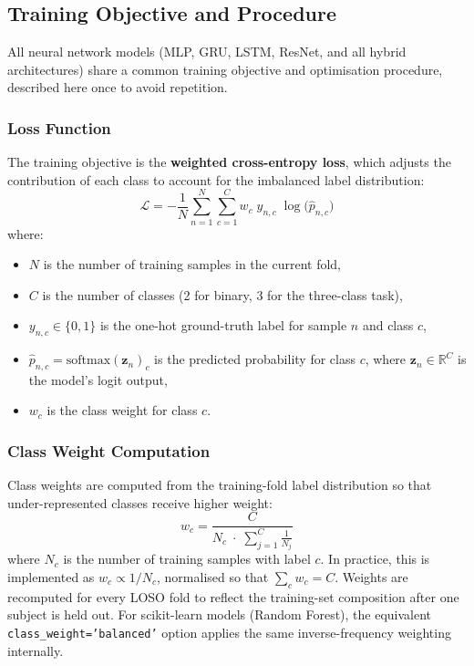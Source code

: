 \documentclass[11pt]{article}
\begin{document}
\subsection{Training Objective and Procedure}
\label{sec:training}

All neural network models (MLP, GRU, LSTM, ResNet, and all hybrid architectures) share a common training objective and optimisation procedure, described here once to avoid repetition.

\subsubsection{Loss Function}
The training objective is the \textbf{weighted cross-entropy loss}, which adjusts the contribution of each class to account for the imbalanced label distribution:
\begin{equation}
\mathcal{L} = -\frac{1}{N}\sum_{n=1}^{N} \sum_{c=1}^{C} w_c \; y_{n,c} \; \log\bigl(\hat{p}_{n,c}\bigr)
\label{eq:wce}
\end{equation}
where:
\begin{itemize}
    \item $N$ is the number of training samples in the current fold,
    \item $C$ is the number of classes (2 for binary, 3 for the three-class task),
    \item $y_{n,c} \in \{0, 1\}$ is the one-hot ground-truth label for sample $n$ and class $c$,
    \item $\hat{p}_{n,c} = \text{softmax}(\mathbf{z}_n)_c$ is the predicted probability for class $c$, where $\mathbf{z}_n \in \mathbb{R}^C$ is the model's logit output,
    \item $w_c$ is the class weight for class $c$.
\end{itemize}

\subsubsection{Class Weight Computation}
Class weights are computed from the training-fold label distribution so that under-represented classes receive higher weight:
\begin{equation}
w_c = \frac{C}{N_c \;\cdot\; \sum_{j=1}^{C} \frac{1}{N_j}}
\label{eq:classweights}
\end{equation}
where $N_c$ is the number of training samples with label $c$.
In practice, this is implemented as $w_c \propto 1/N_c$, normalised so that $\sum_c w_c = C$.
Weights are recomputed for every LOSO fold to reflect the training-set composition after one subject is held out.
For scikit-learn models (Random Forest), the equivalent \texttt{class\_weight='balanced'} option applies the same inverse-frequency weighting internally.
\end{document}
